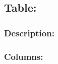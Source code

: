 \documentclass[letterpaper,10pt,english]{sphinxmanual}
\begin{document}
\subsection{Table: }
\label{\detokenize{schema_documentation:table-prospection}}

\subsubsection{Description:}
\label{\detokenize{schema_documentation:id9}}

\subsubsection{Columns:}
\label{\detokenize{schema_documentation:id10}}
\end{document}
